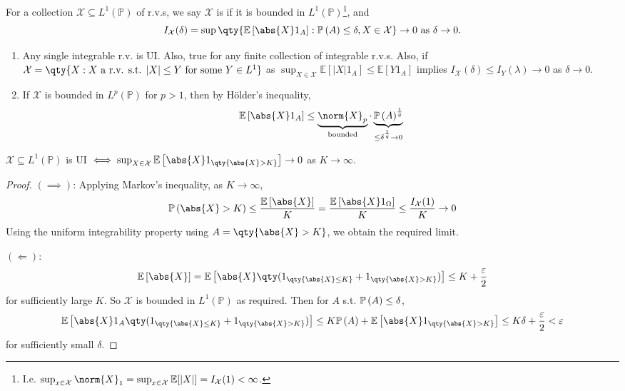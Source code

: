 \begin{definition}
	For a collection $\mathcal X \subseteq L^1(\mathbb P)$ of r.v.s, we say $\mathcal X$ is  if it is bounded in $L^1(\mathbb P)$\footnote{I.e. $\sup_{x \in \mathcal{X}} \norm{X}_1 = \sup_{x \in \mathcal{X}} \mathbb{E}[|X|] = I_{\mathcal{X}}(1) < \infty$.}, and
	\[ I_{\mathcal X}(\delta) = \sup \qty{ \expect{\abs{X}1_A} : \prob{A} \leq \delta, X \in \mathcal X} \to 0 \text{ as } \delta \to 0.\]
\end{definition}

\begin{remark}
	\begin{enumerate}
		\item Any single integrable r.v. is UI.
		Also, true for any finite collection of integrable r.v.s.
		Also, if $\mathcal{X} = \qty{X : X \text{ a r.v. s.t. } |X| \leq Y \text{ for some } Y \in L^1}$ as $\sup_{X \in \mathcal{X}} \mathbb{E}[|X| 1_A] \leq \mathbb{E}[Y 1_A]$ implies $I_{\mathcal{X}}(\delta) \leq I_Y(\lambda) \to 0$ as $\delta \to 0$.
		\item If $\mathcal X$ is bounded in $L^p(\mathbb P)$ for $p > 1$, then by H\"older's inequality,
		\[ \expect{\abs{X}1_A} \leq \underbrace{\norm{X}_p}_{\text{bounded}} \cdot \underbrace{\prob{A}^{\frac 1 q}}_{\leq \delta^{\frac 1 q} \to 0} \]
	\end{enumerate}
\end{remark}


\begin{lemma}
	$\mathcal X \subseteq L^1(\mathbb P)$ is UI $\iff \sup_{X \in \mathcal X} \expect{\abs{X} 1_{\qty{\abs{X} > K}}} \to 0$ as $K \to \infty$.
\end{lemma}

\begin{proof}
	$(\implies)$: Applying Markov's inequality, as $K \to \infty$,
	\[ \prob{\abs{X} > K} \leq \frac{\expect{\abs{X}}}{K} = \frac{\expect{\abs{X}1_{\Omega}}}{K} \leq \frac{I_{\mathcal X}(1)}{K} \to 0 \]
	Using the uniform integrability property using $A = \qty{\abs{X} > K}$, we obtain the required limit.

	$(\Longleftarrow)$:
	\[ \expect{\abs{X}} = \expect{\abs{X}\qty(1_{\qty{\abs{X} \leq K}} + 1_{\qty{\abs{X} > K}})} \leq K + \frac{\varepsilon}{2} \]
	for sufficiently large $K$.
	So $\mathcal X$ is bounded in $L^1(\mathbb P)$ as required.
	Then for $A$ s.t. $\mathbb{P}\left({A}\right) \leq \delta$,
	\[ \expect{\abs{X}1_A\qty(1_{\qty{\abs{X} \leq K}} + 1_{\qty{\abs{X} > K}})} \leq K\prob{A} + \expect{\abs{X}1_{\qty{\abs{X} > K}}} \leq K\delta + \frac{\varepsilon}{2} < \varepsilon \]
	for sufficiently small $\delta$.
\end{proof}

